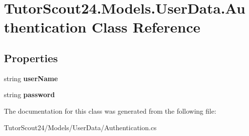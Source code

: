 \hypertarget{class_tutor_scout24_1_1_models_1_1_user_data_1_1_authentication}{}\section{Tutor\+Scout24.\+Models.\+User\+Data.\+Authentication Class Reference}
\label{class_tutor_scout24_1_1_models_1_1_user_data_1_1_authentication}
\subsection*{Properties}
\begin{DoxyCompactItemize}
\item 
\mbox{\label{class_tutor_scout24_1_1_models_1_1_user_data_1_1_authentication_af969eec23aa8a1c31d275ebd0d8ad8a5}} 
string {\bfseries user\+Name}
\item 
\mbox{\label{class_tutor_scout24_1_1_models_1_1_user_data_1_1_authentication_a32fd53379593a0a25cdcdb3c55f99446}} 
string {\bfseries password}
\end{DoxyCompactItemize}


The documentation for this class was generated from the following file\+:\begin{DoxyCompactItemize}
\item 
Tutor\+Scout24/\+Models/\+User\+Data/Authentication.\+cs\end{DoxyCompactItemize}
